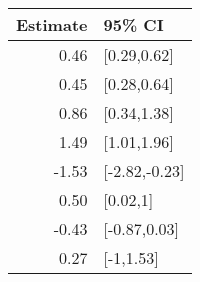 \begin{tabular}{rl}
  \hline
Estimate & 95\% CI \\ 
  \hline
0.46 & [0.29,0.62] \\ 
  0.45 & [0.28,0.64] \\ 
  0.86 & [0.34,1.38] \\ 
  1.49 & [1.01,1.96] \\ 
  -1.53 & [-2.82,-0.23] \\ 
  0.50 & [0.02,1] \\ 
  -0.43 & [-0.87,0.03] \\ 
  0.27 & [-1,1.53] \\ 
   \hline
\end{tabular}

